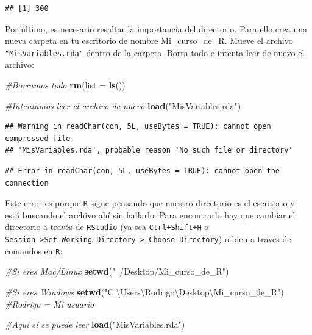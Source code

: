 \documentclass[
]{book}
\newenvironment{Shaded}{\begin{snugshade}}{\end{snugshade}}
\newcommand{\CommentTok}[1]{\textcolor[rgb]{0.56,0.35,0.01}{\textit{#1}}}
\newcommand{\DataTypeTok}[1]{\textcolor[rgb]{0.13,0.29,0.53}{#1}}
\newcommand{\KeywordTok}[1]{\textcolor[rgb]{0.13,0.29,0.53}{\textbf{#1}}}
\newcommand{\NormalTok}[1]{#1}
\newcommand{\StringTok}[1]{\textcolor[rgb]{0.31,0.60,0.02}{#1}}
\begin{document}
\begin{verbatim}
## [1] 300
\end{verbatim}

Por último, es necesario resaltar la importancia del directorio. Para ello crea una nueva carpeta en tu escritorio de nombre Mi\_curso\_de\_R. Mueve el archivo \texttt{"MisVariables.rda"} dentro de la carpeta. Borra todo e intenta leer de nuevo el archivo:

\begin{Shaded}
\begin{Highlighting}[]
\CommentTok{#Borramos todo}
\KeywordTok{rm}\NormalTok{(}\DataTypeTok{list =} \KeywordTok{ls}\NormalTok{())}

\CommentTok{#Intentamos leer el archivo de nuevo}
\KeywordTok{load}\NormalTok{(}\StringTok{"MisVariables.rda"}\NormalTok{)}
\end{Highlighting}
\end{Shaded}

\begin{verbatim}
## Warning in readChar(con, 5L, useBytes = TRUE): cannot open compressed file
## 'MisVariables.rda', probable reason 'No such file or directory'
\end{verbatim}

\begin{verbatim}
## Error in readChar(con, 5L, useBytes = TRUE): cannot open the connection
\end{verbatim}

Este error es porque \texttt{R} sigue pensando que nuestro directorio es el escritorio y está buscando el archivo ahí sin hallarlo. Para encontrarlo hay que cambiar el directorio a través de \texttt{RStudio} (ya sea \texttt{Ctrl+Shift+H} o \texttt{Session\ \textgreater{}Set\ Working\ Directory\ \textgreater{}\ Choose\ Directory}) o bien a través de comandos en \texttt{R}:

\begin{Shaded}
\begin{Highlighting}[]
\CommentTok{#Si eres Mac/Linux}
\KeywordTok{setwd}\NormalTok{(}\StringTok{"~/Desktop/Mi_curso_de_R"}\NormalTok{) }

\CommentTok{#Si eres Windows}
\KeywordTok{setwd}\NormalTok{(}\StringTok{"C:\textbackslash{}Users\textbackslash{}Rodrigo\textbackslash{}Desktop\textbackslash{}Mi_curso_de_R"}\NormalTok{) }\CommentTok{#Rodrigo = Mi usuario}
\end{Highlighting}
\end{Shaded}

\begin{Shaded}
\begin{Highlighting}[]
\CommentTok{#Aquí sí se puede leer}
\KeywordTok{load}\NormalTok{(}\StringTok{"MisVariables.rda"}\NormalTok{)}
\end{Highlighting}
\end{Shaded}
\end{document}
